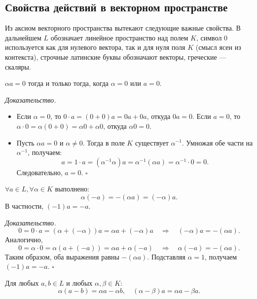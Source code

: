 \documentclass[a4paper,12pt]{article}
\theoremstyle{definition}
\theoremstyle{plain}
\theoremstyle{remark}
\begin{document}
	\subsection{Свойства действий в векторном пространстве}
	
	Из аксиом векторного пространства вытекают следующие важные свойства. В дальнейшем \(L\) обозначает линейное пространство над полем \(K\), символ \(0\) используется как для нулевого вектора, так и для нуля поля \(K\) (смысл ясен из контекста), строчные латинские буквы обозначают векторы, греческие — скаляры.
	
	\begin{tcolorbox}[colback=blue!5, colframe=blue!40!black, title=Свойство 1]
		\(\alpha a = 0\) тогда и только тогда, когда \(\alpha = 0\) или \(a = 0\).
	\end{tcolorbox}
	
	\medskip
	\textit{Доказательство.}
	\begin{itemize}
		\item[\(\Leftarrow\)] Если \(\alpha = 0\), то \(0 \cdot a = (0+0)a = 0a + 0a\), откуда \(0a = 0\). Если \(a = 0\), то \(\alpha \cdot 0 = \alpha(0+0) = \alpha 0 + \alpha 0\), откуда \(\alpha 0 = 0\).
		\item[\(\Rightarrow\)] Пусть \(\alpha a = 0\) и \(\alpha \neq 0\). Тогда в поле \(K\) существует \(\alpha^{-1}\). Умножая обе части на \(\alpha^{-1}\), получаем:
		\[
		a = 1 \cdot a = (\alpha^{-1} \alpha) a = \alpha^{-1} (\alpha a) = \alpha^{-1} \cdot 0 = 0.
		\]
		Следовательно, \(a = 0\). \hfill \(\square\)
	\end{itemize}
	
	\begin{tcolorbox}[colback=blue!5, colframe=blue!40!black, title=Свойство 2]
		\(\forall a \in L, \forall \alpha \in K\) выполнено:
		\[
		\alpha(-a) = -(\alpha a) = (-\alpha)a.
		\]
		В частности, \((-1)a = -a\).
	\end{tcolorbox}
	
	\medskip
	\textit{Доказательство.}
	\[
	0 = 0 \cdot a = (\alpha + (-\alpha))a = \alpha a + (-\alpha)a \quad \Rightarrow \quad (-\alpha)a = -(\alpha a).
	\]
	Аналогично,
	\[
	0 = \alpha \cdot 0 = \alpha(a + (-a)) = \alpha a + \alpha(-a) \quad \Rightarrow \quad \alpha(-a) = -(\alpha a).
	\]
	Таким образом, оба выражения равны \(-(\alpha a)\). Подставляя \(\alpha = 1\), получаем \((-1)a = -a\). \hfill \(\square\)
	
	\begin{tcolorbox}[colback=blue!5, colframe=blue!40!black, title=Свойство 3 (Дистрибутивность относительно вычитания)]
		Для любых \(a, b \in L\) и любых \(\alpha, \beta \in K\):
		\[
		\alpha(a - b) = \alpha a - \alpha b, \quad (\alpha - \beta)a = \alpha a - \beta a.
		\]
	\end{tcolorbox}
	
\end{document}
